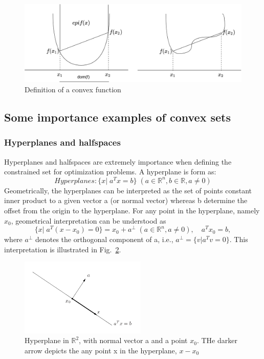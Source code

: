 \documentclass[12pt]{article}%
\begin{document}
\begin{figure}[H]
    \begin{center}
    \includegraphics[width=12cm]{convex-fun.png}
    \caption{Definition of a convex function}\label{f:convex_fun}
    \end{center}
\end{figure}



\subsection{Some importance examples of convex sets}
\subsubsection{Hyperplanes and halfspaces}
Hyperplanes and halfspaces are extremely importance when defining the constrained set for optimization problems. A hyperplane is form as:
\begin{equation}
    Hyperplanes: \{ x|\; a^Tx =b\} \; (a\in \mathbb{R}^n, b \in \mathbb{R}, a\neq 0)
\end{equation} Geometrically, the hyperplanes can be interpreted as the set of points constant inner product to a given vector a (or normal vector) whereas b determine the offset from the origin to the hyperplane. For any point in the hyperplane, namely $x_0$, geometrical interpretation can be understood as \begin{equation}
     \{ x|\; a^T(x-x_0) = 0\} = x_0 + a^{\perp}\; (a\in \mathbb{R}^n, a\neq 0), \quad a^Tx_0 = b, 
\end{equation} where $a^{\perp}$ denotes the orthogonal component of a, i.e., $a^{\perp}=\{ v | a^Tv = 0\}$. This interpretation is illustrated in Fig.~\ref{f:hyperplane_1}.

\begin{figure}[H]
    \begin{center}
    \includegraphics[width=6cm]{hyperplane_1.png}
    \caption{Hyperplane in $\mathbb{R}^2$, with normal vector a and a point $x_0$. THe darker arrow depicts the any point x in the hyperplane, $x-x_0$ ~\cite{boyd2004convex}}\label{f:hyperplane_1}
    \end{center}
\end{figure}
\end{document}
